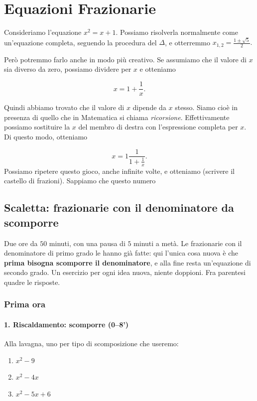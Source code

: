 \documentclass[11pt]{report}
\begin{document}
\section{Equazioni Frazionarie}

Consideriamo l'equazione $x^2=x+1$. Possiamo risolverla normalmente come un'equazione completa, seguendo la procedura del $\Delta$, e otterremmo $x_{1,2}=\frac{1\pm\sqrt 5}{2}.$ 

Però potremmo farlo anche in modo più creativo.
Se assumiamo che il valore di $x$ sia diverso da zero, possiamo dividere per $x$ e otteniamo

$$
x=1+\frac 1 x.
$$

Quindi abbiamo trovato che il valore di $x$ dipende da $x$ stesso. Siamo cioè in presenza di quello che in Matematica si chiama \textit{ricorsione}. Effettivamente possiamo sostituire la $x$ del membro di destra con l'espressione completa per $x$. Di questo modo, otteniamo

$$
x=1\frac{1}{1+\frac 1 x}.
$$
Possiamo ripetere questo gioco, anche infinite volte, e otteniamo (scrivere il castello di frazioni). Sappiamo che questo numero



\subsection{Scaletta: frazionarie con il denominatore da scomporre}

Due ore da $50$ minuti, con una pausa di $5$ minuti a metà. Le frazionarie con il denominatore di primo grado le hanno già fatte: qui l'unica cosa nuova è che \textbf{prima bisogna scomporre il denominatore}, e alla fine resta un'equazione di secondo grado. Un esercizio per ogni idea nuova, niente doppioni. Fra parentesi quadre le risposte.

\subsubsection*{Prima ora}

\paragraph{1. Riscaldamento: scomporre (0--8')}
Alla lavagna, uno per tipo di scomposizione che useremo:
\begin{enumerate}
    \item $x^2-9$ 
    \item $x^2-4x$ \quad [raccoglimento: $x(x-4)$]
    \item $x^2-5x+6$ 
\end{enumerate}
\end{document}
